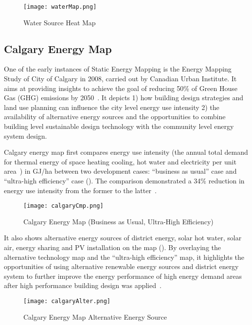 \begin{figure}[h!]
  \centering
  \texttt{[image: waterMap.png]}
  \caption[Water Heat Map]{Water Source Heat Map~\cite{waterHeatMap}}
  \label{fig:waterMap}
\end{figure}

\subsection{Calgary Energy Map}
One of the early instances of Static Energy Mapping is the Energy
Mapping Study of City of Calgary in 2008, carried out by Canadian
Urban Institute. It aims at providing insights to achieve the goal of
reducing 50\% of Green House Gas (GHG) emissions by
2050~\cite{aacip2009}. It depicts 1) how building design strategies
and land use planning can influence the city level energy use
intensity 2) the availability of alternative energy sources and the
opportunities to combine building level sustainable design technology
with the community level energy system design.

Calgary energy map first compares energy use intensity (the annual
total demand for thermal energy of space heating cooling, hot water
and electricity per unit area~\cite{aacip2009}) in GJ/ha between two
development cases: ``business as usual'' case and ``ultra-high
efficiency'' case (). The comparison demonstrated
a 34\% reduction in energy use intensity from the former to the
latter~\cite{aacip2009}.

\begin{figure}[h!]
  \centering
  \texttt{[image: calgaryCmp.png]}
  \caption[Calgary Energy Demand Map]{Calgary Energy Map (Business as Usual, Ultra-High
    Efficiency)~\cite{aacip2009}}
  \label{fig:calgaryCmp}
\end{figure}

It also shows alternative energy sources of district energy, solar hot
water, solar air, energy sharing and PV installation on the map
(). By overlaying the alternative technology
map and the ``ultra-high efficiency'' map, it highlights the
opportunities of using alternative renewable energy sources and
district energy system to further improve the energy performance of
high energy demand areas after high performance building design was
applied~\cite{aacip2009}.

\begin{figure}[h!]
  \centering
  \texttt{[image: calgaryAlter.png]}
  \caption{Calgary Energy Map Alternative Energy Source~\cite{aacip2009}}
  \label{fig:calgaryAlter}
\end{figure}

